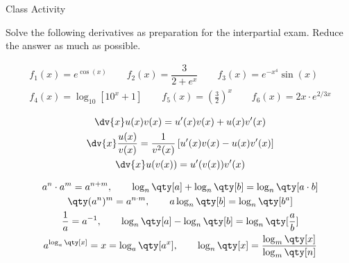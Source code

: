 \documentclass[../tufte-style.tex]{standalone}
\begin{document}
\date{March 5, 2026}


\begin{frame}{Class Activity}

    Solve the following derivatives as preparation for the interpartial exam.
    Reduce the answer as much as possible.

        \vspace{-1em}


        \begin{align*}
            f_1(x) = e^{\cos(x)} \qquad
            f_2(x) = \dfrac{3}{2+e^{x}} \qquad
            f_3(x) = e^{-x^4}\sin(x) \\
            f_4(x) = \log_{10}\left[10^x+1\right] \qquad
            f_5(x) = \left(\frac{3}{2}\right)^{x} \qquad
            f_6(x) = 2x\cdot e^{2/3x}
        \end{align*}

        \vspace{-1em}

    \begin{minipage}[c]{0.45\textwidth}
        \begin{gather*}
            \dv{x}u(x)v(x) = u'(x)v(x) + u(x)v'(x) \\
            \dv{x}\frac{u(x)}{v(x)} = \frac{1}{v^{2}(x)}\left[ u'(x)v(x) - u(x)v'(x) \right] \\
            \dv{x}u(v(x)) = u'(v(x))v'(x)
        \end{gather*}
    \end{minipage}
    \hfill
    \begin{minipage}[c]{0.45\textwidth}
        \begin{gather*}
            a^{n}\cdot a^{m} = a^{n+m},\qquad  \log_{n}\qty[a] + \log_{n}\qty[b] = \log_{n}\qty[a\cdot b] \\
            \qty(a^{n})^{m} = a^{n\cdot m},\qquad  a\log_{n}\qty[b] = \log_{n}\qty[b^a] \\
            \frac{1}{a} = a^{-1},\qquad  \log_{n}\qty[a] - \log_{n}\qty[b] = \log_{n}\qty[\frac{a}{b}] \\
            a^{\log_{a}\qty[x]} = x = \log_a\qty[a^{x}],\qquad  \log_{n}\qty[x] = \frac{\log_{m}\qty[x]}{\log_{m}\qty[n]}
        \end{gather*}

    \end{minipage}

\end{frame}
\end{document}
